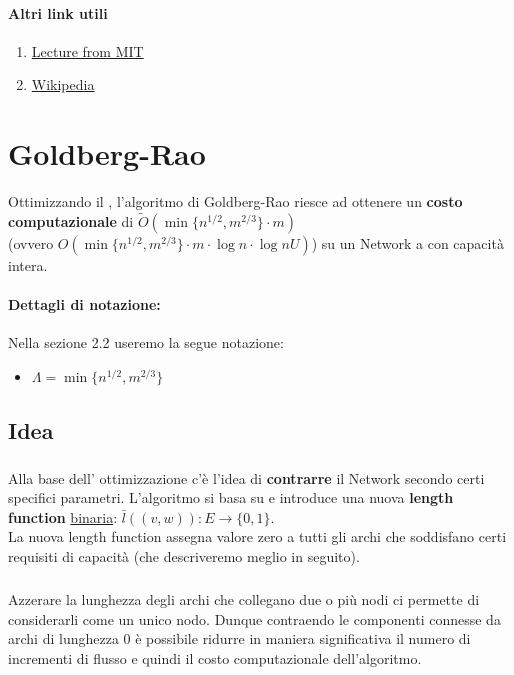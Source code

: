 \documentclass[a4paper, 11pt]{report}
\begin{document}
\paragraph{Altri link utili}\begin{enumerate}
    \item \href{http://courses.csail.mit.edu/6.854/16/Notes/n10-blocking_flows.html}{Lecture from MIT}
    \item \href{https://en.wikipedia.org/wiki/Dinic%27s_algorithm}{Wikipedia}
\end{enumerate}
\newpage

\section{Goldberg-Rao}
\label{gbr}
Ottimizzando il , l'algoritmo di Goldberg-Rao riesce ad ottenere un \textbf{costo computazionale} di $\tilde{O}(\min\{n^{1/2}, m^{2/3}\} \cdot m)$ \\(ovvero $O(\min\{n^{1/2}, m^{2/3}\} \cdot m \cdot \log n \cdot \log nU )$)
su un Network a con capacità intera.
\paragraph*{Dettagli di notazione:}
Nella sezione 2.2 useremo la segue notazione:
\begin{itemize}
    \item $\Lambda = \min\{n^{1/2}, m^{2/3}\}$
\end{itemize}

\subsection{Idea}
    \subparagraph{}
    Alla base dell' ottimizzazione c'è l'idea di \textbf{contrarre} il Network secondo certi specifici parametri.
    L'algoritmo si basa su  e introduce una nuova \textbf{length function} \underline{binaria}: $\bar{l}((v,w)): E\rightarrow \{0,1\}$.\\
    La nuova length function assegna valore zero a tutti gli archi che soddisfano certi requisiti di capacità (che descriveremo meglio in seguito).
    \subparagraph{}
    Azzerare la lunghezza degli archi che collegano due o più nodi ci permette di considerarli come un unico nodo. 
    Dunque contraendo le componenti connesse da archi di lunghezza 0 è possibile ridurre in maniera significativa il numero di incrementi di flusso e quindi il costo computazionale dell'algoritmo.
\end{document}
